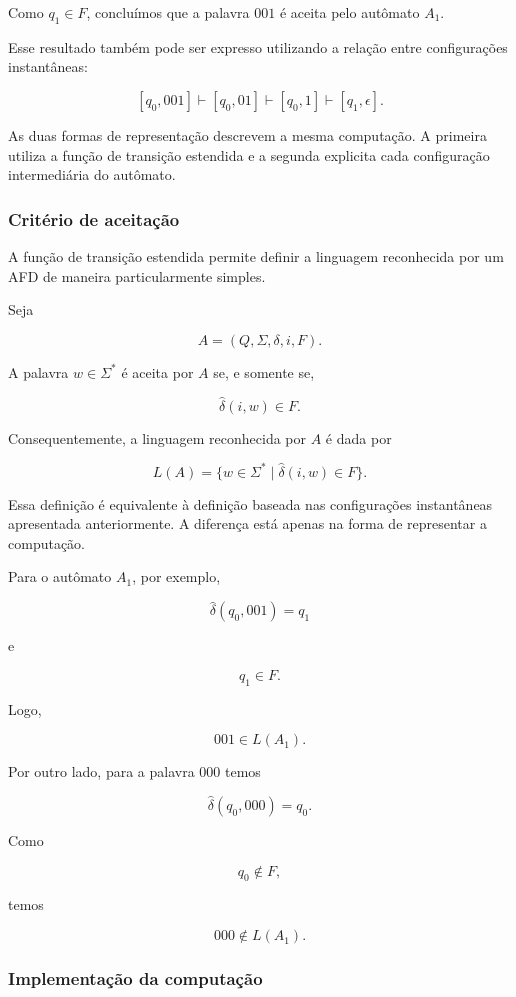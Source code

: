 \documentclass[
  brazilian,
  letterpaper,
]{book}
\theoremstyle{plain}
\theoremstyle{definition}
\theoremstyle{remark}
\begin{document}
Como \(q_1\in F\), concluímos que a palavra \(001\) é aceita pelo
autômato \(A_1\).

Esse resultado também pode ser expresso utilizando a relação entre
configurações instantâneas:

\[
[q_0,001]
\vdash
[q_0,01]
\vdash
[q_0,1]
\vdash
[q_1,\epsilon].
\]

As duas formas de representação descrevem a mesma computação. A primeira
utiliza a função de transição estendida e a segunda explicita cada
configuração intermediária do autômato.

\subsubsection{Critério de
aceitação}\label{crituxe9rio-de-aceitauxe7uxe3o}

A função de transição estendida permite definir a linguagem reconhecida
por um AFD de maneira particularmente simples.

Seja

\[
A=(Q,\Sigma,\delta,i,F).
\]

A palavra \(w\in\Sigma^*\) é aceita por \(A\) se, e somente se,

\[
\hat{\delta}(i,w)\in F.
\]

Consequentemente, a linguagem reconhecida por \(A\) é dada por

\[
L(A)=
\{w\in\Sigma^*
\mid
\hat{\delta}(i,w)\in F
\}.
\]

Essa definição é equivalente à definição baseada nas configurações
instantâneas apresentada anteriormente. A diferença está apenas na forma
de representar a computação.

Para o autômato \(A_1\), por exemplo,

\[
\hat{\delta}(q_0,001)=q_1
\]

e

\[
q_1\in F.
\]

Logo,

\[
001\in L(A_1).
\]

Por outro lado, para a palavra \(000\) temos

\[
\hat{\delta}(q_0,000)=q_0.
\]

Como

\[
q_0\notin F,
\]

temos

\[
000\notin L(A_1).
\]

\subsubsection{Implementação da
computação}\label{implementauxe7uxe3o-da-computauxe7uxe3o}
\end{document}
